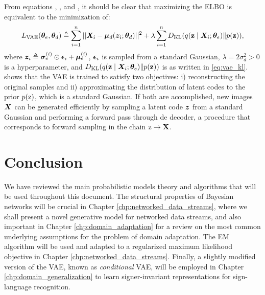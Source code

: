From equations , , and , it should be clear that maximizing the ELBO is equivalent to the minimization of:
\begin{equation}
    \label{eq:vae_loss}
    L_{\text{VAE}}({\bm{\theta}}_e, {\bm{\theta}}_d) \triangleq \sum_{i=1}^n ||{\bm{X}}_i - {\bm{\mu}}_d({\bm{z}}_i; {\bm{\theta}}_d)||^2 + \lambda \sum_{i=1}^n D_{\mathrm{KL}}(q({\mathbf{z}} \mid {\bm{X}}_i; {\bm{\theta}}_e) \Vert p({\mathbf{z}})),
\end{equation}
where ${\bm{z}}_i \triangleq {\bm{\sigma}}_e^{(i)} \odot {\bm{\epsilon}}_i + {\bm{\mu}}_e^{(i)}$, ${\bm{\epsilon}}_i$ is sampled from a standard Gaussian, $\lambda = 2\sigma_d^2 > 0$ is a hyperparameter, and $D_{\mathrm{KL}}(q({\mathbf{z}} \mid {\bm{X}}_i; {\bm{\theta}}_e) \Vert p({\mathbf{z}}))$ is as written in \eqref{eq:vae_kl}.  shows that the VAE is trained to satisfy two objectives: i) reconstructing the original samples and ii) approximating the distribution of latent codes to the prior $p({\textnormal{z}})$, which is a standard Gaussian. If both are accomplished, new images ${\bm{X}}$ can be generated efficiently by sampling a latent code ${\bm{z}}$ from a standard Gaussian and performing a forward pass through de decoder, a procedure that corresponds to forward sampling in the chain ${\textnormal{z}} \rightarrow {\mathbf{X}}$.

\section{Conclusion}
\label{sec:background_conclusion}
We have reviewed the main probabilistic models theory and algorithms that will be used throughout this document. The structural properties of Bayesian networks will be crucial in Chapter \ref{chp:networked_data_streams}, where we shall present a novel generative model for networked data streams, and also important in Chapter \ref{chp:domain_adaptation} for a review on the most common underlying assumptions for the problem of domain adaptation. The EM algorithm will be used and adapted to a regularized maximum likelihood objective in Chapter \ref{chp:networked_data_streams}. Finally, a slightly modified version of the VAE, known as \emph{conditional} VAE, will be employed in Chapter \ref{chp:domain_generalization} to learn signer-invariant representations for sign-language recognition.